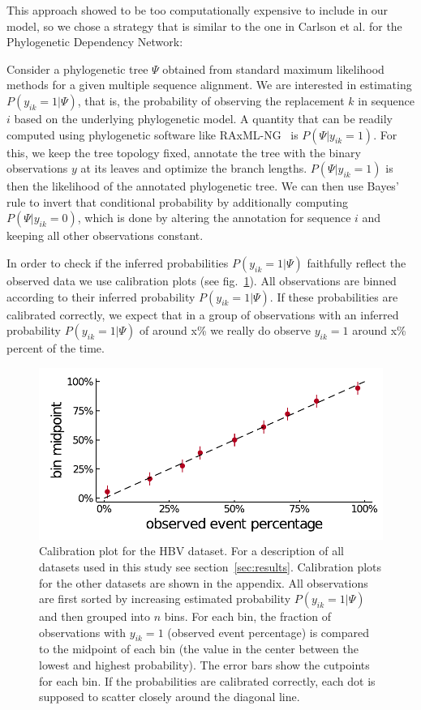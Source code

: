 \documentclass[fleqn,11pt]{SelfArx} %
\begin{document}
This approach showed to be too computationally expensive to include in our model, so we chose a strategy that is similar to the one in Carlson et al. \cite{Carlson2008} for the Phylogenetic Dependency Network:

Consider a phylogenetic tree \(\Psi\) obtained from standard maximum likelihood methods for a given multiple sequence alignment. We are interested in estimating \(P(y_{ik}=1|\Psi)\), that is, the probability of observing the replacement \(k\) in sequence \(i\) based on the underlying phylogenetic model.
A quantity that can be readily computed using phylogenetic software like RAxML-NG~\cite{Kozlov2019} is \(P(\Psi|y_{ik}=1)\). For this, we keep the tree topology fixed, annotate the tree with the binary observations \(y\) at its leaves and optimize the branch lengths. \(P(\Psi|y_{ik}=1)\) is then the likelihood of the annotated phylogenetic tree. We can then use Bayes' rule to invert that conditional probability by additionally computing \(P(\Psi|y_{ik}=0)\), which is done by altering the annotation for sequence \(i\) and keeping all other observations constant.

In order to check if the inferred probabilities \(P(y_{ik}=1|\Psi)\) faithfully reflect the observed data we use calibration plots (see fig.~\ref{fig:phylogeny-calibration}). All observations are binned according to their inferred probability \(P(y_{ik}=1|\Psi)\). If these probabilities are calibrated correctly, we expect that in a group of observations with an inferred probability \(P(y_{ik}=1|\Psi)\) of around x\% we really do observe \(y_{ik}=1\) around x\% percent of the time.

\begin{figure}[!ht]
  \includegraphics[width=1\linewidth]{plots/phylogeny_calibration.pdf}
  \caption{Calibration plot for the HBV dataset. For a description of all datasets used in this study see section~\ref{sec:results}. Calibration plots for the other datasets are shown in the appendix.
  All observations are first sorted by increasing estimated probability \(P(y_{ik}=1|\Psi)\) and then grouped into \(n\) bins.
  For each bin, the fraction of observations with \(y_{ik}=1\) (observed event percentage) is compared to the midpoint of each bin (the value in the center between the lowest and highest probability). The error bars show the cutpoints for each bin. If the probabilities are calibrated correctly, each dot is supposed to scatter closely around the diagonal line.}
  \label{fig:phylogeny-calibration}
\end{figure}
\end{document}
